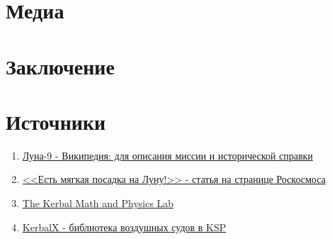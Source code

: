 \section{Медиа}

\section*{Заключение}

\section*{Источники}
\begin{enumerate}
	\item \href{https://ru.wikipedia.org/wiki/%D0%9B%D1%83%D0%BD%D0%B0-9}{Луна-9 - Википедия: для описания миссии и исторической справки}
	\item \href{https://www.roscosmos.ru/29868/#1}{<<Есть мягкая посадка на Луну!>> - статья на странице Роскосмоса}
	\item \href{https://sites.google.com/view/kspmath/home}{The Kerbal Math and Physics Lab}
	\item \href{https://kerbalx.com/}{KerbalX - библиотека воздушных судов в KSP}
\end{enumerate}

